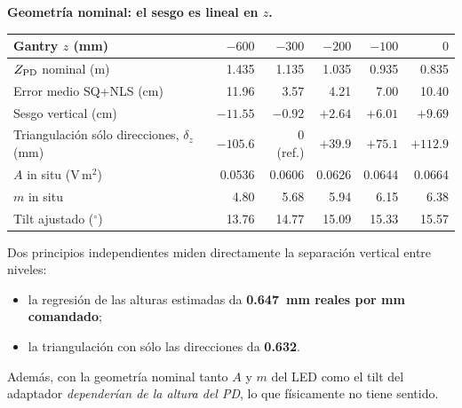 \documentclass[11pt,a4paper]{article}
\begin{document}
\textbf{Geometría nominal: el sesgo es lineal en $z$.}
\begin{center}\small
\begin{tabular}{lrrrrr}\toprule
Gantry $z$ (mm) & $-600$ & $-300$ & $-200$ & $-100$ & $0$\\\midrule
$Z_{\rm PD}$ nominal (m) & 1.435 & 1.135 & 1.035 & 0.935 & 0.835\\
Error medio SQ+NLS (cm) & 11.96 & 3.57 & 4.21 & 7.00 & 10.40\\
Sesgo vertical (cm) & $-11.55$ & $-0.92$ & $+2.64$ & $+6.01$ & $+9.69$\\
Triangulación sólo direcciones, $\delta_z$ (mm) & $-105.6$ & 0 (ref.) & $+39.9$ & $+75.1$ & $+112.9$\\
$A$ in situ (V\,m$^2$) & 0.0536 & 0.0606 & 0.0626 & 0.0644 & 0.0664\\
$m$ in situ & 4.80 & 5.68 & 5.94 & 6.15 & 6.38\\
Tilt ajustado ($^\circ$) & 13.76 & 14.77 & 15.09 & 15.33 & 15.57\\\bottomrule
\end{tabular}\end{center}
Dos principios independientes miden directamente la separación vertical entre niveles:
\begin{itemize}
\item la regresión de las alturas estimadas da \textbf{0.647~mm reales por mm comandado};
\item la triangulación con sólo las direcciones da \textbf{0.632}.
\end{itemize}
Además, con la geometría nominal tanto $A$ y $m$ del LED como el tilt del adaptador \emph{dependerían de la altura del PD}, lo que físicamente no tiene sentido.
\end{document}
